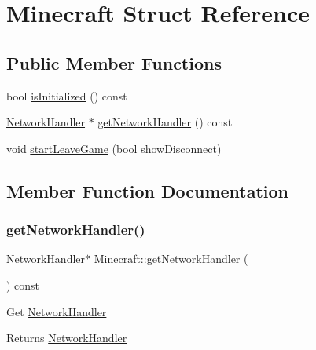 \hypertarget{struct_minecraft}{}\section{Minecraft Struct Reference}
\label{struct_minecraft}
\subsection*{Public Member Functions}
\begin{DoxyCompactItemize}
\item 
bool \mbox{\hyperlink{struct_minecraft_afc05914a149a97b83542b80ab892ac1c}{is\+Initialized}} () const
\item 
\mbox{\hyperlink{struct_network_handler}{Network\+Handler}} $\ast$ \mbox{\hyperlink{struct_minecraft_a5bef70bfc5e4a012da8410daa6a1851b}{get\+Network\+Handler}} () const
\item 
void \mbox{\hyperlink{struct_minecraft_abe192960ddeb4dfd96d82d2f73b1d595}{start\+Leave\+Game}} (bool show\+Disconnect)
\end{DoxyCompactItemize}


\subsection{Member Function Documentation}
\mbox{\label{struct_minecraft_a5bef70bfc5e4a012da8410daa6a1851b}} 
\subsubsection{\texorpdfstring{getNetworkHandler()}{getNetworkHandler()}}
{\footnotesize\ttfamily \mbox{\hyperlink{struct_network_handler}{Network\+Handler}}$\ast$ Minecraft\+::get\+Network\+Handler (\begin{DoxyParamCaption}{ }\end{DoxyParamCaption}) const}

Get \mbox{\hyperlink{struct_network_handler}{Network\+Handler}} \begin{DoxyReturn}{Returns}
\mbox{\hyperlink{struct_network_handler}{Network\+Handler}} 
\end{DoxyReturn}
\mbox{\label{struct_minecraft_afc05914a149a97b83542b80ab892ac1c}} 
